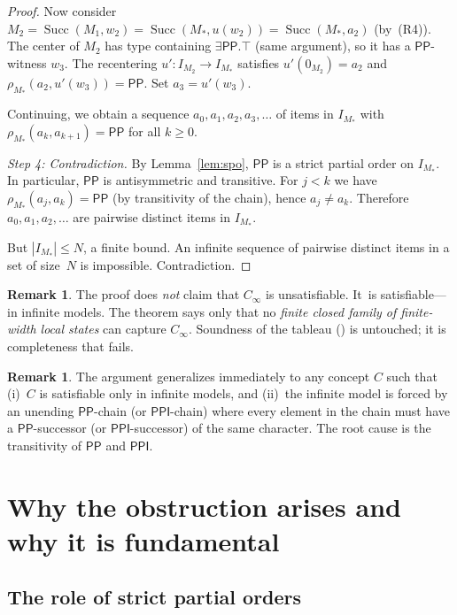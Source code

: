 \documentclass[11pt]{article}
\theoremstyle{definition}
\newtheorem{remark}[theorem]{Remark}
\newcommand{\Pp}{\mathsf{PP}}
\newcommand{\Ppi}{\mathsf{PPI}}
\newcommand{\Succ}{\operatorname{Succ}}
\begin{document}
\begin{proof}
Now consider $M_2 = \Succ(M_1,w_2) = \Succ(M_\ast,u(w_2)) =
\Succ(M_\ast,a_2)$ (by~(R4)).  The center of $M_2$ has type
containing $\exists\Pp.\top$ (same argument), so it has a
$\Pp$-witness $w_3$.  The recentering
$u':I_{M_2}\to I_{M_\ast}$ satisfies $u'(0_{M_2})=a_2$ and
$\rho_{M_\ast}(a_2,u'(w_3))=\Pp$.  Set $a_3=u'(w_3)$.

Continuing, we obtain a sequence $a_0,a_1,a_2,a_3,\dots$ of items in
$I_{M_\ast}$ with $\rho_{M_\ast}(a_k,a_{k+1})=\Pp$ for all $k\ge 0$.

\medskip\noindent\textit{Step 4: Contradiction.}\;
By Lemma~\ref{lem:spo}, $\Pp$ is a strict partial order on
$I_{M_\ast}$.  In particular, $\Pp$ is antisymmetric and transitive.
For $j<k$ we have $\rho_{M_\ast}(a_j,a_k)=\Pp$ (by transitivity of
the chain), hence $a_j\ne a_k$.  Therefore $a_0,a_1,a_2,\dots$ are
pairwise distinct items in $I_{M_\ast}$.

But $|I_{M_\ast}|\le N$, a finite bound.  An infinite sequence of
pairwise distinct items in a set of size~$N$ is impossible.
Contradiction.
\end{proof}

\begin{remark}
The proof does \emph{not} claim that $C_\infty$ is unsatisfiable.
It~is satisfiable---in infinite models.  The theorem says only that no
\emph{finite closed family of finite-width local states} can capture
$C_\infty$.  Soundness of the tableau (\cite[Corollary~6.6]{GPT2026})
is untouched; it is completeness that fails.
\end{remark}

\begin{remark}
The argument generalizes immediately to any concept $C$ such that
(i)~$C$ is satisfiable only in infinite models, and (ii)~the
infinite model is forced by an unending $\Pp$-chain (or $\Ppi$-chain)
where every element in the chain must have a $\Pp$-successor (or
$\Ppi$-successor) of the same character.  The root cause is the
transitivity of $\Pp$ and $\Ppi$.
\end{remark}

\section{Why the obstruction arises and why it is fundamental}
\label{sec:why}

\subsection{The role of strict partial orders}
\end{document}
